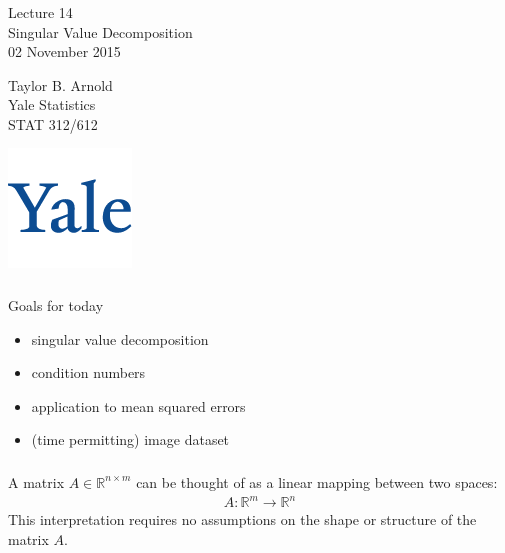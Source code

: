 



\begin{frame}[fragile] \frametitle{}

\vfill

{\fontsize{0.7cm}{0cm}\selectfont Lecture 14 \\\vspace{0.2cm}
Singular Value Decomposition}\\\vspace{0.5cm}
02 November 2015

\vspace{2cm}

\begin{minipage}{0.6\textwidth}
Taylor B. Arnold \\
Yale Statistics \\
STAT 312/612
\end{minipage}
\hfill
\begin{minipage}{0.3\textwidth}\raggedleft
\includegraphics[scale=0.3]{../yale-logo.png}
\end{minipage}%

\end{frame}

\begin{frame}[fragile] \frametitle{}

{\color{yaleblue}\fontsize{16pt}{20pt}\selectfont Goals for today}

\begin{itemize}
\item singular value decomposition
\item condition numbers
\item application to mean squared errors
\item (time permitting) image dataset
\end{itemize}

\end{frame}

\begin{frame}[fragile] \frametitle{}

A matrix $A \in \mathbb{R}^{n \times m}$ can be thought of as
a linear mapping between two spaces:
\begin{align*}
A: \mathbb{R}^m \rightarrow \mathbb{R}^n
\end{align*}
This interpretation requires no assumptions on the shape or
structure of the matrix $A$.

\end{frame}

